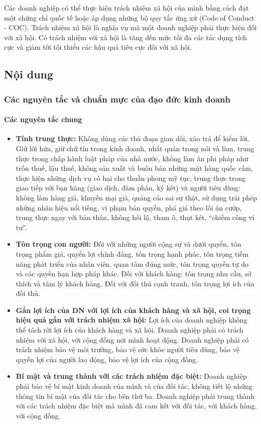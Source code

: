 \documentclass{article}
\begin{document}
        \vspace{0.2cm}
        Các doanh nghiệp có thể thực hiện trách nhiệm xã hội của mình bằng cách đạt một chứng chỉ quốc tế hoặc áp dụng những bộ quy tắc ứng xử (Code of Conduct - COC). Trách nhiệm xã hội là nghĩa vụ mà một doanh nghiệp phải thực hiện đối với xã hội. Có trách nhiệm với xã hội là tăng đến mức tối đa các tác dụng tích cực và giảm tới tối thiểu các hậu quả tiêu cực đối với xã hội.

\subsection{Nội dung}
    \subsubsection{Các nguyên tắc và chuẩn mực của đạo đức kinh doanh}
        \paragraph{Các nguyên tắc chung}
            \begin{itemize}
                \item \textbf{Tính trung thực:} Không dùng các thủ đoạn gian dối, xảo trá để kiếm lời. Giữ lời hứa, giữ chữ tín trong kinh doanh, nhất quán trong nói và làm, trung thực trong chấp hành luật pháp của nhà nước, không làm ăn phi pháp như trốn thuế, lậu thuế, không sản xuất và buôn bán những mặt hàng quốc cấm, thực hiện những dịch vụ có hại cho thuần phong mỹ tục, trung thực trong giao tiếp với bạn hàng (giao dịch, đàm phán, ký kết) và người tiêu dùng: không làm hàng giả, khuyến mại giả, quảng cáo sai sự thật, sử dụng trái phép những nhãn hiệu nổi tiếng, vi phạm bản quyền, phá giá theo lối ăn cướp, trung thực ngay với bản thân, không hối lộ, tham ô, thụt két, “chiếm công vi tư”.
                \item \textbf{Tôn trọng con người:} Đối với những người cộng sự và dưới quyển, tôn trọng phẩm giá, quyển lợi chính đáng, tôn trọng hạnh phúc, tôn trọng tiềm năng phát triển của nhân viên, quan tâm đúng mức, tôn trọng quyền tự do và các quyền hạn hợp pháp khác. Đối với khách hàng: tôn trọng nhu cầu, sở thích và tâm lý khách hàng. Đối với đối thủ cạnh tranh, tôn trọng lợi ích của đối thủ.
                \item \textbf{Gắn lợi ích của DN với lợi ích của khách hàng và xã hội, coi trọng hiệu quả gắn với trách nhiệm xã hội:} Lợi ích của doanh nghiệp không thể tách rời lợi ích của khách hàng và xã hội. Doanh nghiệp phải có trách nhiệm với xã hội, với cộng đồng nơi mình hoạt động. Doanh nghiệp phải có trách nhiệm bảo vệ môi trường, bảo vệ sức khỏe người tiêu dùng, bảo vệ quyền lợi của người lao động, bảo vệ lợi ích của cộng đồng.
                \item \textbf{Bí mật và trung thành với các trách nhiệm đặc biệt:} Doanh nghiệp phải bảo vệ bí mật kinh doanh của mình và của đối tác, không tiết lộ những thông tin bí mật của đối tác cho bên thứ ba. Doanh nghiệp phải trung thành với các trách nhiệm đặc biệt mà mình đã cam kết với đối tác, với khách hàng, với cộng đồng.
            \end{itemize}
\end{document}
